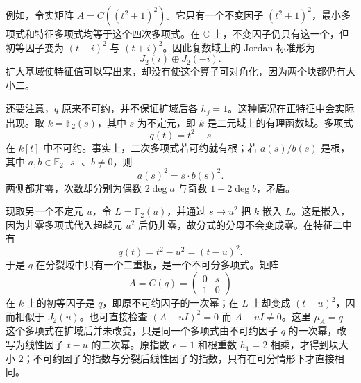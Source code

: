 例如，令实矩阵 \(A=C((t^2+1)^2)\)。它只有一个不变因子 \((t^2+1)^2\)，最小多项式和特征多项式均等于这个四次多项式。在 \(\mathbb C\) 上，不变因子仍只有这一个，但初等因子变为 \((t-i)^2\) 与 \((t+i)^2\)。因此复数域上的 Jordan 标准形为
\[
	J_2(i)\oplus J_2(-i).
\]
扩大基域使特征值可以写出来，却没有使这个算子可对角化，因为两个块都仍有大小二。

\ProseParagraphBreak
还要注意，\(q\) 原来不可约，并不保证扩域后各 \(h_j=1\)。这种情况在正特征中会实际出现。取 \(k=\mathbb F_2(s)\)，其中 \(s\) 为不定元，即 \(k\) 是二元域上的有理函数域。多项式
\[
	q(t)=t^2-s
\]
在 \(k[t]\) 中不可约。事实上，二次多项式若可约就有根；若 \(a(s)/b(s)\) 是根，其中 \(a,b\in\mathbb F_2[s]\)、\(b\ne0\)，则
\[
	a(s)^2=s\cdot b(s)^2.
\]
两侧都非零，次数却分别为偶数 \(2\deg a\) 与奇数 \(1+2\deg b\)，矛盾。

\ProseParagraphBreak
现取另一个不定元 \(u\)，令 \(L=\mathbb F_2(u)\)，并通过 \(s\mapsto u^2\) 把 \(k\) 嵌入 \(L\)。这是嵌入，因为非零多项式代入超越元 \(u^2\) 后仍非零，故分式的分母不会变成零。在特征二中有
\[
	q(t)=t^2-u^2=(t-u)^2.
\]
于是 \(q\) 在分裂域中只有一个二重根，是一个不可分多项式。矩阵
\[
	A=C(q)=\begin{pmatrix}0&s\\1&0\end{pmatrix}
\]
在 \(k\) 上的初等因子是 \(q\)，即原不可约因子的一次幂；在 \(L\) 上却变成 \((t-u)^2\)，因而相似于 \(J_2(u)\)。也可直接检查 \((A-uI)^2=0\) 而 \(A-uI\ne0\)。这里 \(\mu_A=q\) 这个多项式在扩域后并未改变，只是同一个多项式由不可约因子 \(q\) 的一次幂，改写为线性因子 \(t-u\) 的二次幂。原指数 \(e=1\) 和根重数 \(h_1=2\) 相乘，才得到块大小 \(2\)；不可约因子的指数与分裂后线性因子的指数，只有在可分情形下才直接相同。
